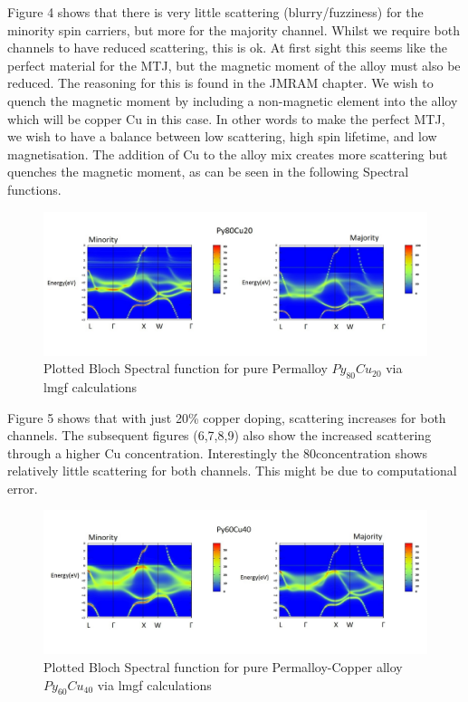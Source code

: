 \documentclass[12pt]{article}
\begin{document}
Figure 4 shows that there is very little scattering (blurry/fuzziness) for the minority spin carriers, but more for the majority channel. Whilst we require both channels to have reduced scattering, this is ok. At first sight this seems like the perfect material for the MTJ, but the magnetic moment of the alloy must also be reduced. The reasoning for this is found in the JMRAM chapter. We wish to quench the magnetic moment by including a non-magnetic element into the alloy which will be copper Cu in this case. In other words to make the perfect MTJ, we wish to have a balance between low scattering, high spin lifetime, and low magnetisation. The addition of Cu to the alloy mix creates more scattering but quenches the magnetic moment, as can be seen in the following Spectral functions.

\begin{figure}[htp]
    \centering
    \begin{measuredfigure}
    \includegraphics[scale=0.40]{specfunc/cu20}
    \caption{Plotted Bloch Spectral function for pure Permalloy $Py_{80}Cu_{20}$ via lmgf calculations}
    \end{measuredfigure}
    \end{figure}
\clearpage
Figure 5 shows that with just 20\% copper doping, scattering increases for both channels. The subsequent figures (6,7,8,9) also show the increased scattering through a higher Cu concentration. Interestingly the 80\Cu concentration shows relatively little scattering for both channels. This might be due to computational error.
\begin{figure}[h!]
    \centering
    \begin{measuredfigure}
    \includegraphics[scale=0.40]{specfunc/cu40}
    \caption{Plotted Bloch Spectral function for pure Permalloy-Copper alloy $Py_{60}Cu_{40}$ via lmgf calculations}
    \end{measuredfigure}
    \end{figure}
\end{document}
